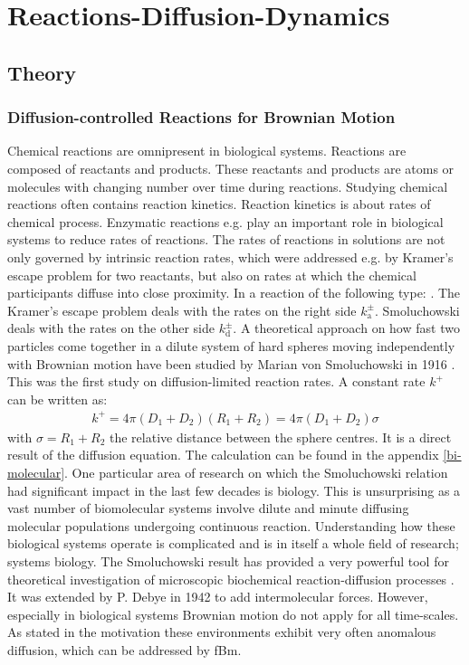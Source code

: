 \documentclass[
  a4paper,BCOR10mm,oneside,
  bibtotoc,idxtotoc,
  headsepline,footsepline,%
  fleqn,openbib
]{scrbook}
\begin{document}
\chapter{Reactions-Diffusion-Dynamics}
\section{Theory}
\subsection{Diffusion-controlled Reactions for Brownian Motion}
Chemical reactions are omnipresent in biological systems. Reactions are composed of reactants and products. These reactants and products are atoms or molecules with changing number over time during reactions. Studying chemical reactions often contains reaction kinetics. Reaction kinetics is about rates of chemical process. Enzymatic reactions e.g. play an important role in biological systems to reduce rates of reactions. The rates of reactions in solutions are not only governed by intrinsic reaction rates, which were addressed e.g. by Kramer's escape problem for two reactants, but also on rates at which the chemical participants diffuse into close proximity. In a reaction of the following type: . \newline The Kramer's escape problem deals with the rates on the right side  $k^{\pm}_{\mathrm{a}}$. Smoluchowski deals with the rates on the other side $k^{\pm}_{\mathrm{d}}$. \newline  A theoretical approach on how fast two particles come together in a dilute system of hard spheres moving independently with Brownian motion have been studied by Marian von Smoluchowski in 1916 \cite{Smoluchowski1}. This was the first study on diffusion-limited reaction rates. A constant rate $k^{+}$ can be written as:
\begin{align}
 k^{+}=4 \pi (D_1+D_2)(R_1+R_2)=4 \pi (D_1+D_2) \sigma \label{reactionrate11}
\end{align}
with $\sigma = R_1+R_2$ the relative distance between the sphere centres.  It is a direct result of the diffusion equation. The calculation can be found in the appendix \ref{bi-molecular}. One particular area of research on which the Smoluchowski relation had significant impact in the last few decades is biology. This is unsurprising as a vast number of biomolecular systems involve dilute and minute diffusing molecular populations undergoing continuous reaction. Understanding how these biological systems operate is complicated and is in itself a whole field of research; systems biology. The Smoluchowski result has provided a very powerful tool for theoretical investigation of microscopic biochemical reaction-diffusion processes \cite{Flegg}. It was extended by P. Debye in 1942 to add intermolecular forces. However, especially in biological systems Brownian motion do not apply for all time-scales. As stated in the motivation these environments exhibit very often anomalous diffusion, which can be addressed by fBm. 
\end{document}
